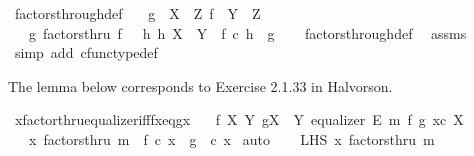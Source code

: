 \begin{isabellebody}
\isanewline
{}\isamarkupfalse%
\ factors{\isacharunderscore}{\kern0pt}through{\isacharunderscore}{\kern0pt}def{}{\isacharcolon}{\kern0pt}\isanewline
\ \ \ {\isachardoublequoteopen}g\ {\isacharcolon}{\kern0pt}\ X\ {\isasymrightarrow}\ Z{\isachardoublequoteclose}\ {\isachardoublequoteopen}f\ {\isacharcolon}{\kern0pt}\ Y\ {\isasymrightarrow}\ Z{\isachardoublequoteclose}\isanewline
\ \ \ {\isachardoublequoteopen}g\ factorsthru\ f\ {\isasymlongleftrightarrow}\ {\isacharparenleft}{\kern0pt}{\isasymexists}\ h{\isachardot}{\kern0pt}\ h{\isacharcolon}{\kern0pt}\ X\ {\isasymrightarrow}\ Y\ {\isasymand}\ f\ {\isasymcirc}\isactrlsub c\ h\ {\isacharequal}{\kern0pt}\ g{\isacharparenright}{\kern0pt}{\isachardoublequoteclose}\isanewline
%
\isadelimproof
\ \ %
\endisadelimproof
%
\isatagproof
{}\isamarkupfalse%
\ factors{\isacharunderscore}{\kern0pt}through{\isacharunderscore}{\kern0pt}def\ \isamarkupfalse%
\ assms\ \isamarkupfalse%
\ {\isacharparenleft}{\kern0pt}simp\ add{\isacharcolon}{\kern0pt}\ cfunc{\isacharunderscore}{\kern0pt}type{\isacharunderscore}{\kern0pt}def{\isacharparenright}{\kern0pt}%
\endisatagproof
{\isafoldproof}%
%
\isadelimproof
%
\endisadelimproof
%
\begin{isamarkuptext}%
The lemma below corresponds to Exercise 2.1.33 in Halvorson.%
\end{isamarkuptext}\isamarkuptrue%
\isamarkupfalse%
\ xfactorthru{\isacharunderscore}{\kern0pt}equalizer{\isacharunderscore}{\kern0pt}iff{\isacharunderscore}{\kern0pt}fx{\isacharunderscore}{\kern0pt}eq{\isacharunderscore}{\kern0pt}gx{\isacharcolon}{\kern0pt}\isanewline
\ \ \ {\isachardoublequoteopen}f{\isacharcolon}{\kern0pt}\ X{\isasymrightarrow}\ Y{\isachardoublequoteclose}\ {\isachardoublequoteopen}g{\isacharcolon}{\kern0pt}X\ {\isasymrightarrow}\ Y{\isachardoublequoteclose}\ {\isachardoublequoteopen}equalizer\ E\ m\ f\ g{\isachardoublequoteclose}\ {\isachardoublequoteopen}x{\isasymin}\isactrlsub c\ X{\isachardoublequoteclose}\isanewline
\ \ \ {\isachardoublequoteopen}x\ factorsthru\ m\ {\isasymlongleftrightarrow}\ f\ {\isasymcirc}\isactrlsub c\ x\ {\isacharequal}{\kern0pt}\ g\ \ {\isasymcirc}\isactrlsub c\ x{\isachardoublequoteclose}\isanewline
%
\isadelimproof
%
\endisadelimproof
%
\isatagproof
{}\isamarkupfalse%
\ auto\isanewline
\ \ \isamarkupfalse%
\ LHS{\isacharcolon}{\kern0pt}\ {\isachardoublequoteopen}x\ factorsthru\ m{\isachardoublequoteclose}\isanewline

\end{isabellebody}
